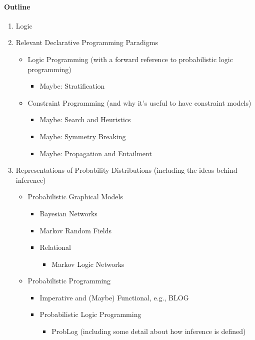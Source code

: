 \paragraph{Outline} %
\begin{enumerate}
\item Logic
\item Relevant Declarative Programming Paradigms
  \begin{itemize}
  \item Logic Programming (with a forward reference to probabilistic logic programming)
    \begin{itemize}
    \item Maybe: Stratification
    \end{itemize}
  \item Constraint Programming (and why it's useful to have constraint models)
    \begin{itemize}
    \item Maybe: Search and Heuristics
    \item Maybe: Symmetry Breaking
    \item Maybe: Propagation and Entailment
    \end{itemize}
  \end{itemize}
\item Representations of Probability Distributions (including the ideas behind inference)
  \begin{itemize}
  \item Probabilistic Graphical Models
    \begin{itemize}
    \item Bayesian Networks
    \item Markov Random Fields
    \item Relational
      \begin{itemize}
      \item Markov Logic Networks
      \end{itemize}
    \end{itemize}
  \item Probabilistic Programming
    \begin{itemize}
    \item Imperative and (Maybe) Functional, e.g., BLOG
    \item Probabilistic Logic Programming
      \begin{itemize}
      \item ProbLog (including some detail about how inference is defined)
      \end{itemize}

\end{itemize}
\end{itemize}
\end{enumerate}

